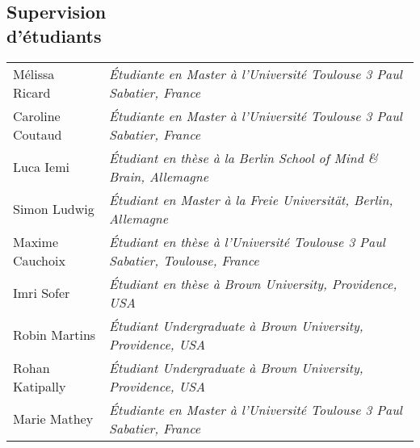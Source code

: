 \documentclass[margin,line]{resume}
\begin{document}
\begin{resume}
\vspace{3mm}
\section{\mysidestyle Supervision\\d'étudiants}
	
	\begin{tabular}{@{}ll} %
	Mélissa Ricard & \textsl{\'Etudiante en Master à l'Université Toulouse 3 Paul Sabatier, France}\\
	Caroline Coutaud & \textsl{\'Etudiante en Master à l'Université Toulouse 3 Paul Sabatier, France}\\
	Luca Iemi       & \textsl{\'Etudiant en thèse à la Berlin School of Mind \& Brain, Allemagne}\\
	Simon Ludwig    & \textsl{\'Etudiant en Master à la Freie Universität, Berlin, Allemagne}\\
	Maxime Cauchoix & \textsl{\'Etudiant en thèse à l'Université Toulouse 3 Paul Sabatier, Toulouse, France}\\
	Imri Sofer      & \textsl{\'Etudiant en thèse à Brown University, Providence, USA}\\
	Robin Martins   & \textsl{\'Etudiant Undergraduate à Brown University, Providence, USA} \\
	Rohan Katipally & \textsl{\'Etudiant Undergraduate à Brown University, Providence, USA} \\
	Marie Mathey    & \textsl{\'Etudiante en Master à l'Université Toulouse 3 Paul Sabatier, France}
	\end{tabular}
	





\end{resume}
\end{document}
